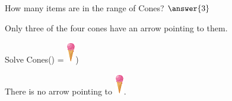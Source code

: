 \documentclass{ximera}
\begin{document}
\begin{exercise}
How many items are in the range of Cones? $\answer{3}$
  \begin{feedback}
Only three of the four cones have an arrow pointing to them.
  \end{feedback}
\end{exercise}







\begin{exercise}
 Solve Cones() = {\includegraphics[width=15px,height=35px]{pics/elements/cones/cones4.png}})
  \begin{multipleChoice}
  \end{multipleChoice}
  \begin{feedback}
There is no arrow pointing to {\includegraphics[width=15px,height=35px]{pics/elements/cones/cones4.png}}.
  \end{feedback}
\end{exercise}
\end{document}
